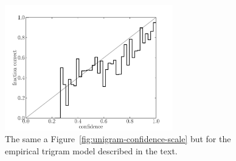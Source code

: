 \documentclass[11pt]{article}
\newcommand{\fig}[1]{Figure~\ref{fig:#1}}
\newcommand{\figlabel}[1]{\label{fig:#1}}
\begin{document}
\begin{figure}[htbp]
\begin{center}
    \includegraphics[width=0.65\textwidth]{empirical_confidence_scale.pdf}
\end{center}
\caption{%
The same a \fig{unigram-confidence-scale} but for the empirical trigram model
described in the text.
\figlabel{empirical-confidence-scale}}
\end{figure}
\end{document}
